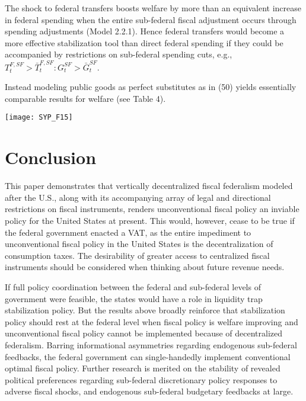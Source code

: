 \documentclass[12pt,letterpaper]{article}
\begin{document}
The shock to federal transfers boosts welfare by more than an equivalent increase in federal spending when the entire sub-federal fiscal adjustment occurs through spending adjustments (Model 2.2.1). Hence federal transfers would become a more effective stabilization tool than direct federal spending if they could be accompanied by restrictions on sub-federal spending cuts, e.g., $T^{F,SF}_t > \bar{T}^{F,SF}_t : G^{SF}_t > \bar{G}^{SF}_t $. 

Instead modeling public goods as perfect substitutes as in (50) yields essentially comparable results for welfare (see Table 4).

\begin{center}
\texttt{[image: SYP\_F15]}
\end{center}
 
%
% 
\section{Conclusion}

This paper demonstrates that vertically decentralized fiscal federalism modeled after the U.S., along with its accompanying array of legal and directional restrictions on fiscal instruments, renders unconventional fiscal policy an inviable policy for the United States at present. This would, however, cease to be true if the federal government enacted a VAT, as the entire impediment to unconventional fiscal policy in the United States is the decentralization of consumption taxes.  The desirability of greater access to centralized fiscal instruments should be considered when thinking about future revenue needs.

If full policy coordination between the federal and sub-federal levels of government were feasible, the states would have a role in liquidity trap stabilization policy. But the results above broadly reinforce that stabilization policy should rest at the federal level when fiscal policy is welfare improving and unconventional fiscal policy cannot be implemented because of decentralized federalism. Barring informational asymmetries regarding endogenous sub-federal feedbacks, the federal government can single-handedly implement conventional optimal fiscal policy. Further research is merited on the stability of revealed political preferences regarding sub-federal discretionary policy responses to adverse fiscal shocks, and endogenous sub-federal budgetary feedbacks at large.
\end{document}
